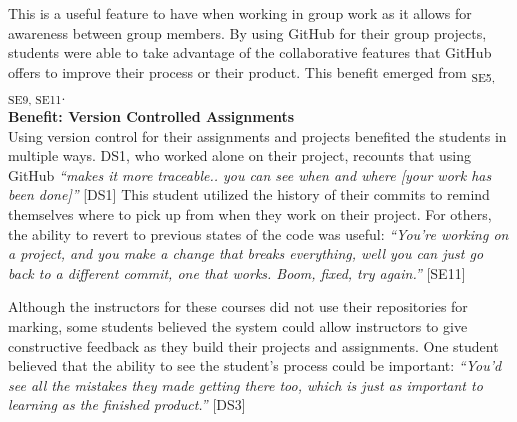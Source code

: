 This is a useful feature to have when working in group work as it allows for awareness between group members. By using GitHub for their group projects, students were able to take advantage of the collaborative features that GitHub offers to improve their process or their product. This benefit emerged from \textsubscript{SE5, SE9, SE11}. \\







\textbf{Benefit: Version Controlled Assignments} \\
Using version control for their assignments and projects benefited the students in multiple ways. DS1, who worked alone on their project, recounts that using GitHub \textit{``makes it more traceable.. you can see when and where [your work has been done]''} [DS1] This student utilized the history of their commits to remind themselves where to pick up from when they work on their project. For others, the ability to revert to previous states of the code was useful: \textit{``You're working on a project, and you make a change that breaks everything, well you can just go back to a different commit, one that works. Boom, fixed, try again.''} [SE11]

Although the instructors for these courses did not use their repositories for marking, some students believed the system could allow instructors to give constructive feedback as they build their projects and assignments. One student believed that the ability to see the student's process could be important: \textit{``You'd see all the mistakes they made getting there too, which is just as important to learning as the finished product.''} [DS3]

